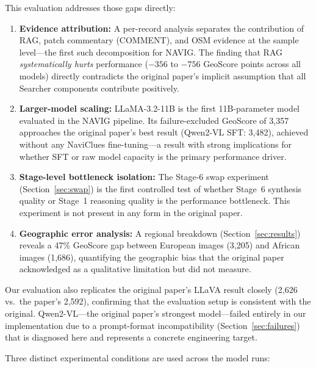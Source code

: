 \documentclass[11pt]{article}
\begin{document}
This evaluation addresses those gaps directly:

\begin{enumerate}[noitemsep]
  \item \textbf{Evidence attribution:} A per-record analysis separates the
    contribution of RAG, patch commentary (COMMENT), and OSM evidence at the sample
    level---the first such decomposition for NAVIG. The finding that RAG
    \emph{systematically hurts} performance ($-356$ to $-756$ GeoScore points across
    all models) directly contradicts the original paper's implicit assumption that all
    Searcher components contribute positively.
  \item \textbf{Larger-model scaling:} LLaMA-3.2-11B is the first 11B-parameter
    model evaluated in the NAVIG pipeline. Its failure-excluded GeoScore of 3{,}357
    approaches the original paper's best result (Qwen2-VL SFT: 3{,}482), achieved
    without any NaviClues fine-tuning---a result with strong implications for whether
    SFT or raw model capacity is the primary performance driver.
  \item \textbf{Stage-level bottleneck isolation:} The Stage-6 swap experiment
    (Section~\ref{sec:swap}) is the first controlled test of whether Stage~6
    synthesis quality or Stage~1 reasoning quality is the performance bottleneck.
    This experiment is not present in any form in the original paper.
  \item \textbf{Geographic error analysis:} A regional breakdown (Section~\ref{sec:results})
    reveals a 47\% GeoScore gap between European images (3{,}205) and African images
    (1{,}686), quantifying the geographic bias that the original paper acknowledged as
    a qualitative limitation but did not measure.
\end{enumerate}

Our evaluation also replicates the original paper's LLaVA result closely
(2{,}626 vs.\ the paper's 2{,}592), confirming that the evaluation setup is consistent
with the original. Qwen2-VL---the original paper's strongest model---failed entirely in
our implementation due to a prompt-format incompatibility (Section~\ref{sec:failures})
that is diagnosed here and represents a concrete engineering target.

Three distinct experimental conditions are used across the model runs:
\end{document}
